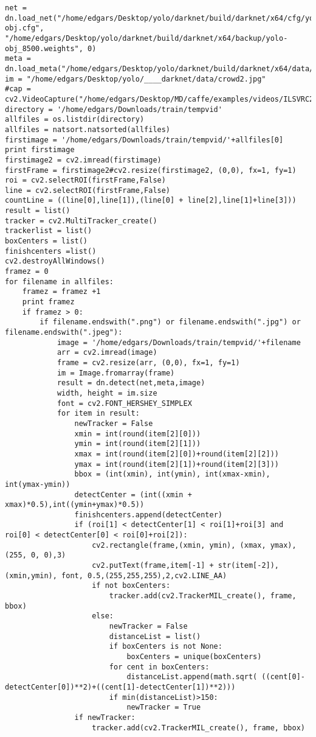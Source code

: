 \documentclass[12pt,paper=a4]{report}
\begin{document}
\begin{lstlisting}[basicstyle=\tiny]
net = dn.load_net("/home/edgars/Desktop/yolo/darknet/build/darknet/x64/cfg/yolo-obj.cfg", "/home/edgars/Desktop/yolo/darknet/build/darknet/x64/backup/yolo-obj_8500.weights", 0)
meta = dn.load_meta("/home/edgars/Desktop/yolo/darknet/build/darknet/x64/data/obj.data")
im = "/home/edgars/Desktop/yolo/____darknet/data/crowd2.jpg"
#cap = cv2.VideoCapture("/home/edgars/Desktop/MD/caffe/examples/videos/ILSVRC2015_train_00755001.mp4")
directory = '/home/edgars/Downloads/train/tempvid'
allfiles = os.listdir(directory)
allfiles = natsort.natsorted(allfiles)
firstimage = '/home/edgars/Downloads/train/tempvid/'+allfiles[0]
print firstimage
firstimage2 = cv2.imread(firstimage) 
firstFrame = firstimage2#cv2.resize(firstimage2, (0,0), fx=1, fy=1)
roi = cv2.selectROI(firstFrame,False)
line = cv2.selectROI(firstFrame,False)
countLine = ((line[0],line[1]),(line[0] + line[2],line[1]+line[3]))
result = list()
tracker = cv2.MultiTracker_create()    
trackerlist = list()
boxCenters = list()
finishcenters =list()
cv2.destroyAllWindows() 
framez = 0
for filename in allfiles:
	framez = framez +1
	print framez
	if framez > 0:
		if filename.endswith(".png") or filename.endswith(".jpg") or filename.endswith(".jpeg"): 
			image = '/home/edgars/Downloads/train/tempvid/'+filename
			arr = cv2.imread(image)  
			frame = cv2.resize(arr, (0,0), fx=1, fy=1)        
			im = Image.fromarray(frame)      
			result = dn.detect(net,meta,image)
			width, height = im.size
			font = cv2.FONT_HERSHEY_SIMPLEX  
			for item in result:
				newTracker = False
				xmin = int(round(item[2][0]))
				ymin = int(round(item[2][1]))
				xmax = int(round(item[2][0])+round(item[2][2]))
				ymax = int(round(item[2][1])+round(item[2][3]))
				bbox = (int(xmin), int(ymin), int(xmax-xmin), int(ymax-ymin))
				detectCenter = (int((xmin + xmax)*0.5),int((ymin+ymax)*0.5))
				finishcenters.append(detectCenter)
				if (roi[1] < detectCenter[1] < roi[1]+roi[3] and roi[0] < detectCenter[0] < roi[0]+roi[2]):
					cv2.rectangle(frame,(xmin, ymin), (xmax, ymax),(255, 0, 0),3)
					cv2.putText(frame,item[-1] + str(item[-2]),(xmin,ymin), font, 0.5,(255,255,255),2,cv2.LINE_AA)
					if not boxCenters:
						tracker.add(cv2.TrackerMIL_create(), frame, bbox)
					else:
						newTracker = False
						distanceList = list()
						if boxCenters is not None:
							boxCenters = unique(boxCenters)
						for cent in boxCenters:
							distanceList.append(math.sqrt( ((cent[0]-detectCenter[0])**2)+((cent[1]-detectCenter[1])**2)))
						if min(distanceList)>150:
							newTracker = True
				if newTracker:
					tracker.add(cv2.TrackerMIL_create(), frame, bbox)

\end{lstlisting}
\end{document}

